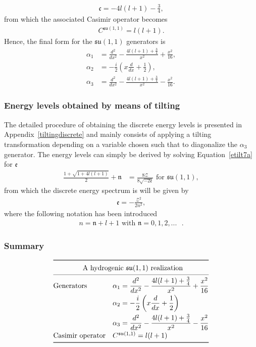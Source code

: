 \documentclass[12pt,a4paper]{report}
\theoremstyle{definition}
\theoremstyle{remark}
\theoremstyle{remark}
\begin{document}
\begin{align*}
\mathfrak{c}=-4l(l+1)-\frac{3}{4},
\end{align*}
from which the associated Casimir operator becomes
\begin{align*}
C^{\mathfrak{su}(1,1)}=l(l+1).
\end{align*}
Hence, the final form for the $\mathfrak{su}(1,1)$ generators is
\begin{align*}
\alpha_1&=\frac{d^2}{dx^2}-\frac{4l(l+1)+\frac{3}{4}}{x^2}+\frac{x^2}{16}, \\
\alpha_2&=-\frac{i}{2}\left(x\frac{d}{dx}+\frac{1}{2}\right),\\
\alpha_3&=\frac{d^2}{dx^2}-\frac{4l(l+1)+\frac{3}{4}}{x^2}-\frac{x^2}{16}.
\end{align*}

\subsubsection{Energy levels obtained by means of tilting}
The detailed procedure of obtaining the discrete energy levels is presented in Appendix~\ref{tiltingdiscrete} and mainly consists of applying a tilting transformation depending on a variable chosen such that to diagonalize the $\alpha_3$ generator. The energy levels can simply be derived by solving Equation~\ref{etilt7a} for $\mathfrak{e}$
\begin{align*}
\frac{1+\sqrt{1+4l(l+1)}}{2}+\mathfrak{n}&=\frac{8\mathcal{Z}}{8\sqrt{-2\mathfrak{e}}} \text{ for }\mathfrak{su}(1,1),
\end{align*}
from which the discrete energy spectrum is will be given by
\begin{align*}
\mathfrak{e}=-\frac{\mathcal{Z}^2}{2n^2},
\end{align*}
where the following notation has been introduced
\begin{align*}
n=\mathfrak{n}+l+1 \text{ with }\mathfrak{n}=0,1,2,... \text{ }.
\end{align*}

\subsubsection{Summary}
\begin{equation*}
\def\arraystretch{1.3}
\begin{array}{@{}ll@{}}
\toprule
 \multicolumn{2}{c@{}}{\text{A hydrogenic }\mathfrak{su}(1,1) \text{ realization}} \\
\cmidrule{1-2}
 \text{Generators} & \begin{aligned}[t]
  \alpha_1&=\frac{d^2}{dx^2}-\frac{4l(l+1)+\frac{3}{4}}{x^2}+\frac{x^2}{16} \\
\alpha_2&=-\frac{i}{2}\left(x\frac{d}{dx}+\frac{1}{2}\right)\\
\alpha_3&=\frac{d^2}{dx^2}-\frac{4l(l+1)+\frac{3}{4}}{x^2}-\frac{x^2}{16}
  \end{aligned}\\
 \text{Casimir operator} & C^{\mathfrak{su}(1,1)}=l(l+1)\\
\bottomrule
\end{array}
\end{equation*}
\end{document}
